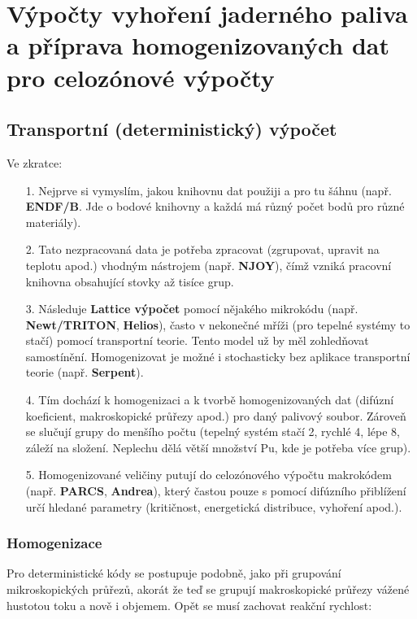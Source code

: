 \section{Výpočty vyhoření jaderného paliva a příprava homogenizovaných dat pro celozónové výpočty}

\subsection{Transportní (deterministický) výpočet}

Ve zkratce: 

\begin{enumerate}
  \item[1.] Nejprve si vymyslím, jakou knihovnu dat použiji a pro tu šáhnu (např. \textbf{ENDF/B}. Jde o bodové knihovny a každá má různý počet bodů pro různé materiály).
  \item[2.] Tato nezpracovaná data je potřeba zpracovat (zgrupovat, upravit na teplotu apod.) vhodným nástrojem (např. \textbf{NJOY}), čímž vzniká pracovní knihovna obsahující stovky až tisíce grup.
  \item[3.] Následuje \textbf{Lattice výpočet} pomocí nějakého mikrokódu (např. \textbf{Newt/TRITON}, \textbf{Helios}), často v nekonečné mříži (pro tepelné systémy to stačí) pomocí transportní teorie. Tento model už by měl zohledňovat samostínění. Homogenizovat je možné i stochasticky bez aplikace transportní teorie (např. \textbf{Serpent}).
  \item[4.] Tím dochází k homogenizaci a k tvorbě homogenizovaných dat (difúzní koeficient, makroskopické průřezy apod.) pro daný palivový soubor. Zároveň se slučují grupy do menšího počtu (tepelný systém stačí 2, rychlé 4, lépe 8, záleží na složení. Neplechu dělá větší množství Pu, kde je potřeba více grup).
  \item[5.] Homogenizované veličiny putují do celozónového výpočtu makrokódem (např. \textbf{PARCS}, \textbf{Andrea}), který častou pouze s pomocí difúzního přiblížení určí hledané parametry (kritičnost, energetická distribuce, vyhoření apod.).
\end{enumerate}

\subsubsection{Homogenizace}

Pro deterministické kódy se postupuje podobně, jako při grupování mikroskopických průřezů, akorát že teď se grupují makroskopické průřezy vážené hustotou toku a nově i objemem. Opět se musí zachovat reakční rychlost:

